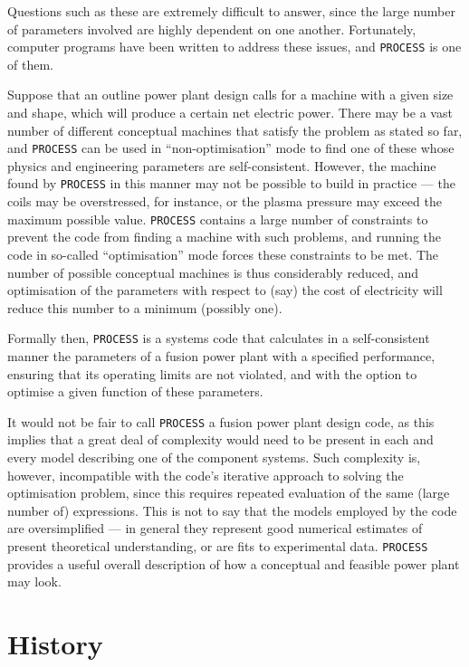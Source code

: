 \documentclass[11pt,a4paper]{report}
\newcommand{\process}{\mbox{\texttt{PROCESS}}}
\begin{document}
Questions such as these are extremely difficult to answer, since the large
number of parameters involved are highly dependent on one another.
Fortunately, computer programs have been written to address these issues, and
\process\/ is one of them.

Suppose that an outline power plant design calls for a machine with a given
size and shape, which will produce a certain net electric power.  There may be
a vast number of different conceptual machines that satisfy the problem as
stated so far, and \process\/ can be used in ``non-optimisation'' mode to find
one of these whose physics and engineering parameters are
self-consistent. However, the machine found by \process\/ in this manner may
not be possible to build in practice --- the coils may be overstressed, for
instance, or the plasma pressure may exceed the maximum possible
value. \process\/ contains a large number of constraints to prevent the code
from finding a machine with such problems, and running the code in so-called
``optimisation'' mode forces these constraints to be met. The number of
possible conceptual machines is thus considerably reduced, and optimisation of
the parameters with respect to (say) the cost of electricity will reduce this
number to a minimum (possibly one).

Formally then, \process\/ is a systems code that calculates in a
self-consistent manner the parameters of a fusion power plant with a specified
performance, ensuring that its operating limits are not violated, and with the
option to optimise a given function of these parameters.

It would not be fair to call \process\/ a fusion power plant design code, as
this implies that a great deal of complexity would need to be present in each
and every model describing one of the component systems. Such complexity is,
however, incompatible with the code's iterative approach to solving the
optimisation problem, since this requires repeated evaluation of the same
(large number of) expressions. This is not to say that the models employed by
the code are oversimplified --- in general they represent good numerical
estimates of present theoretical understanding, or are fits to experimental
data. \process\/ provides a useful overall description of how a conceptual and
feasible power plant may look.

\section{History}
\end{document}
